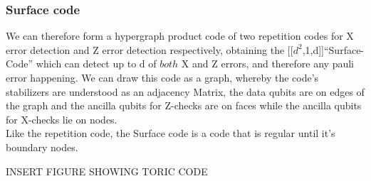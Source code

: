 \subsubsection{Surface code}
We can therefore form a hypergraph product code of two repetition
codes for X error detection and Z error detection respectively,
obtaining the [[$d^2$,1,d]]``Surface-Code'' which can detect up
to d of $both$ X and Z errors, and 
therefore any pauli error happening.
We can draw this code as a graph, whereby the code's stabilizers
are understood as an adjacency Matrix, the data qubits are on 
edges of the graph and the ancilla qubits for Z-checks are on faces
while the ancilla qubits for X-checks lie on nodes.\\
Like the repetition code, the Surface code is a code that is regular until
it's boundary nodes.

INSERT FIGURE SHOWING TORIC CODE